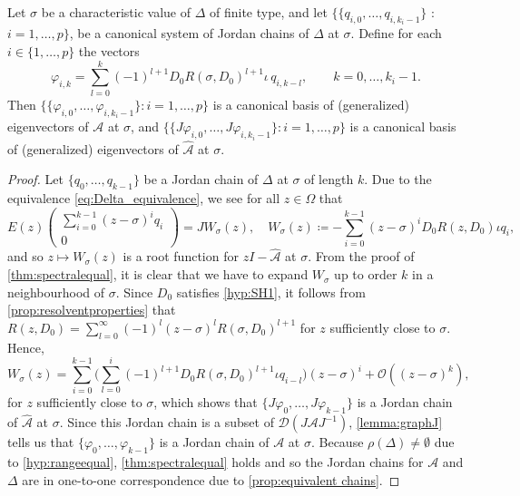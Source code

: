 \documentclass[english]{myarticle}
\begin{document}
\begin{sloppypar}
\begin{corollary} \label{cor:Jordanchains}
Let $\sigma$ be a characteristic value of $\Delta$ of finite type, and let 
$\{ \{ q_{i,0}, \dots, q_{i,k_i-1} \}$ : $i=1,\dots,p\}$, be a canonical system of Jordan chains of $\Delta$ at $\sigma$. Define for each $i\in \{1,\dots,p\}$ the vectors
\begin{equation*}
    \varphi_{i,k} = \sum_{l=0}^k (-1)^{l+1} D_0 R(\sigma,D_0)^{l+1} \iota\, q_{i,k-l},
    \qquad k = 0,\dots,k_i-1 .
\end{equation*}
Then $\{ \{ {\varphi}_{i,0},\dots,{\varphi}_{i,k_i-1} \} : i=1,\dots,p\}$ is a canonical basis of (generalized) eigenvectors of $\mathcal{A}$ at $\sigma$, and $\{ \{J \varphi_{i,0},\dots,J{\varphi}_{i,k_i-1} \} : i=1,\dots,p\}$ is a canonical basis of (generalized) eigenvectors of $\hat{\mathcal{A}}$ at $\sigma$.
\end{corollary}
\begin{proof}
Let $\{q_0,\dots,q_{k-1} \}$ be a Jordan chain of $\Delta$ at $\sigma$ of length $k$. Due to the equivalence \eqref{eq:Delta_equivalence}, we see for all $z \in \Omega$ that
\begin{equation*}
    E(z)
    \begin{pmatrix}
        \sum_{i=0}^{k-1}(z-\sigma)^{i}q_i \\
        0
    \end{pmatrix}
    =JW_\sigma(z), \quad W_\sigma(z) \coloneqq - \sum_{i=0}^{k-1} (z-\sigma)^{i} D_0 R(z,{D_0}) \iota q_i,
\end{equation*}
and so $z \mapsto W_\sigma(z)$ is a root function for $zI - \hat{\mathcal{A}}$ at $\sigma$. From the proof of \cref{thm:spectralequal}, it is clear that we have to expand $W_\sigma$ up to order $k$ in a neighbourhood of $\sigma$. Since $D_0$ satisfies \ref{hyp:SH1}, it follows from \cref{prop:resolventproperties} that $R(z,D_0) = \sum_{l=0}^{\infty} (-1)^l(z-\sigma)^l R(\sigma,D_0)^{l+1}$ for $z$ sufficiently close to $\sigma$. Hence,
\begin{equation*}
    W_\sigma(z) = \sum_{i=0}^{k-1} \bigg( \sum_{l=0}^i (-1)^{l+1} D_0R(\sigma,D_0)^{l+1} \iota q_{i-l} \bigg)(z-\sigma)^i + \mathcal{O}((z-\sigma)^k), 
\end{equation*}
for $z$ sufficiently close to $\sigma$, which shows that $\{J \varphi_{0},\dots,J{\varphi}_{k-1} \}$ is a Jordan chain of $\hat{\mathcal{A}}$ at $\sigma$. Since this Jordan chain is a subset of $\mathcal{D}(J\mathcal{A}J^{-1})$, \cref{lemma:graphJ} tells us that $\{ \varphi_{0},\dots,{\varphi}_{k-1} \}$ is a Jordan chain of $\mathcal{A}$ at $\sigma$. Because $\rho(\Delta) \neq \emptyset$ due to \ref{hyp:rangeequal}, \cref{thm:spectralequal} holds and so the Jordan chains for $\mathcal{A}$ and $\Delta$ are in one-to-one correspondence due to \cref{prop:equivalent chains}.
\end{proof}


\end{sloppypar}
\end{document}
